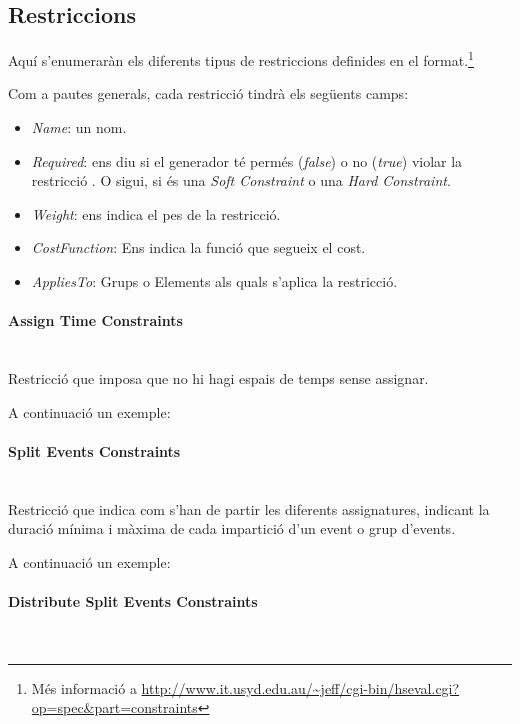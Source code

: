\documentclass[11pt,a4paper,twoside]{report}
\begin{document}
  \subsection{Restriccions}

  Aquí s'enumeraràn els diferents tipus de restriccions definides en el format.\footnote{Més informació a \url{http://www.it.usyd.edu.au/~jeff/cgi-bin/hseval.cgi?op=spec&part=constraints}} 

  Com a pautes generals, cada restricció tindrà els següents camps:
  \begin{itemize}
    \item \textit{Name}: un nom.
    \item \textit{Required}: ens diu si el generador té permés (\textit{false}) o no (\textit{true}) violar la restricció . 
        O sigui, si és una \textit{Soft Constraint} o una \textit{Hard Constraint}.
    \item \textit{Weight}: ens indica el pes de la restricció.
    \item \textit{CostFunction}: Ens indica la funció que segueix el cost.
    \item \textit{AppliesTo}: Grups o Elements als quals s'aplica la restricció.
  \end{itemize}

  \paragraph*{Assign Time Constraints} ~\\

  Restricció que imposa que no hi hagi espais de temps sense assignar.

  A continuació un exemple:

  


  \paragraph*{Split Events Constraints} ~\\
  
  Restricció que indica com s'han de partir les diferents assignatures, indicant la duració mínima i màxima de cada impartició d'un event o grup d'events.

  A continuació un exemple:

  

  \paragraph*{Distribute Split Events Constraints} ~\\
\end{document}
